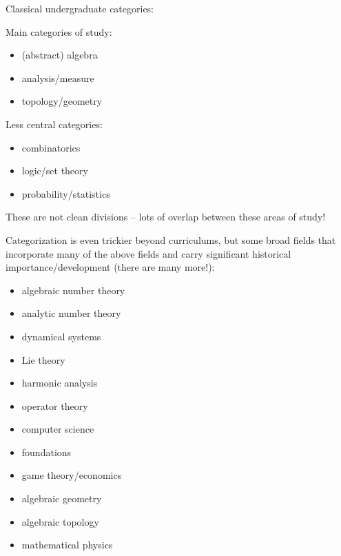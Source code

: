 \documentclass[12pt]{article}
\begin{document}
\noindent Classical undergraduate categories:
\begin{center}
  \begin{minipage}{0.45\textwidth}
    Main categories of study: 
    \begin{itemize}
      \item (abstract) algebra 
      \item analysis/measure
      \item topology/geometry
    \end{itemize}
  \end{minipage}
  \begin{minipage}{0.45\textwidth}
    Less central categories:
    \begin{itemize}
      \item combinatorics
      \item logic/set theory
      \item probability/statistics
    \end{itemize}
  \end{minipage}
\end{center}
These are not clean divisions -- lots of overlap between these areas of study! 

\noindent Categorization is even trickier beyond curriculums, but some
broad fields that incorporate many of the above fields and carry
significant historical importance/development (there are many more!):
\begin{center}
  \begin{multicols}{3}
    \begin{itemize}
      \item algebraic number theory
      \item analytic number theory
      \item dynamical systems
      \item Lie theory
      \item harmonic analysis
      \item operator theory
      \item computer science
      \item foundations
      \item game theory/economics
      \item algebraic geometry
      \item algebraic topology
      \item mathematical physics 
    \end{itemize}
  \end{multicols}
\end{center}
\end{document}
